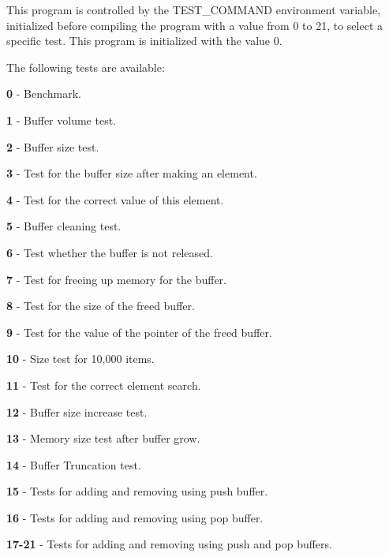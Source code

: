 This program is controlled by the TEST\+\_\+\+COMMAND environment variable, initialized before compiling the program with a value from 0 to 21, to select a specific test. This program is initialized with the value 0.

The following tests are available\+:

\begin{DoxyItemize}
\item {\bfseries{0}} -\/ Benchmark. \item {\bfseries{1}} -\/ Buffer volume test. \item {\bfseries{2}} -\/ Buffer size test. \item {\bfseries{3}} -\/ Test for the buffer size after making an element. \item {\bfseries{4}} -\/ Test for the correct value of this element. \item {\bfseries{5}} -\/ Buffer cleaning test. \item {\bfseries{6}} -\/ Test whether the buffer is not released. \item {\bfseries{7}} -\/ Test for freeing up memory for the buffer. \item {\bfseries{8}} -\/ Test for the size of the freed buffer. \item {\bfseries{9}} -\/ Test for the value of the pointer of the freed buffer. \item {\bfseries{10}} -\/ Size test for 10,000 items. \item {\bfseries{11}} -\/ Test for the correct element search. \item {\bfseries{12}} -\/ Buffer size increase test. \item {\bfseries{13}} -\/ Memory size test after buffer grow. \item {\bfseries{14}} -\/ Buffer Truncation test. \item {\bfseries{15}} -\/ Tests for adding and removing using push buffer. \item {\bfseries{16}} -\/ Tests for adding and removing using pop buffer. \item {\bfseries{17-\/21}} -\/ Tests for adding and removing using push and pop buffers. \end{DoxyItemize}

